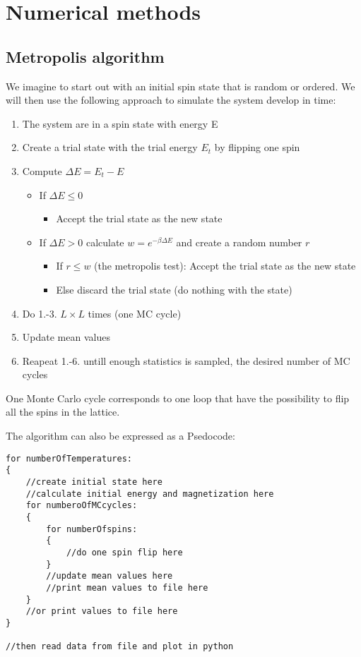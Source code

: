 \documentclass[11pt,a4wide]{article}
\begin{document}
\section{Numerical methods}
\subsection{Metropolis algorithm}
We imagine to start out with an initial spin state that is random or ordered. We will then use the following approach to simulate the system develop in time:
\begin{enumerate}
\item The system are in a spin state with energy E
\item Create a trial state with the trial energy $E_t$ by flipping one spin
\item Compute $\Delta E = E_t - E$
\begin{itemize}
\item If $\Delta E \leq 0$
\begin{itemize}
\item Accept the trial state as the new state 
\end{itemize}
\item If $\Delta E >0$ calculate $w = e^{-\beta \Delta E}$ and create a random number $r$
\begin{itemize}
\item If $r\leq w$ (the metropolis test): Accept the trial state as the new state 
\item Else discard the trial state (do nothing with the state)
\end{itemize}
\end{itemize}
\item Do 1.-3. $L\times L$ times (one MC cycle)
\item Update mean values 
\item Reapeat 1.-6. untill enough statistics is sampled, the desired number of MC cycles
\end{enumerate}

One Monte Carlo cycle corresponds to one loop that have the possibility to flip all the spins in the lattice. 

The algorithm can also be expressed as a Psedocode:
\begin{lstlisting}
for numberOfTemperatures:
{
	//create initial state here
	//calculate initial energy and magnetization here
	for numberoOfMCcycles:
	{
		for numberOfspins:
		{
			//do one spin flip here
		}
		//update mean values here
		//print mean values to file here
	}	
	//or print values to file here
}

//then read data from file and plot in python
\end{lstlisting}
\end{document}
